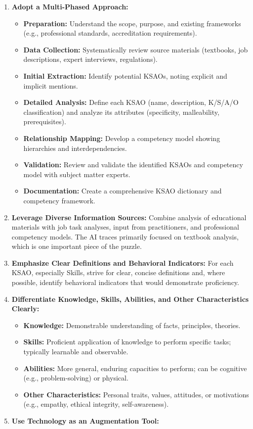 \documentclass[
  letterpaper,
  DIV=11,
  numbers=noendperiod]{scrartcl}
\providecommand{\tightlist}{%
  \setlength{\itemsep}{0pt}\setlength{\parskip}{0pt}}
\begin{document}
\begin{enumerate}
\def\labelenumi{\arabic{enumi}.}
\item
  \textbf{Adopt a Multi-Phased Approach:}

  \begin{itemize}
  \tightlist
  \item
    \textbf{Preparation:} Understand the scope, purpose, and existing
    frameworks (e.g., professional standards, accreditation
    requirements).
  \item
    \textbf{Data Collection:} Systematically review source materials
    (textbooks, job descriptions, expert interviews, regulations).
  \item
    \textbf{Initial Extraction:} Identify potential KSAOs, noting
    explicit and implicit mentions.
  \item
    \textbf{Detailed Analysis:} Define each KSAO (name, description,
    K/S/A/O classification) and analyze its attributes (specificity,
    malleability, prerequisites).
  \item
    \textbf{Relationship Mapping:} Develop a competency model showing
    hierarchies and interdependencies.
  \item
    \textbf{Validation:} Review and validate the identified KSAOs and
    competency model with subject matter experts.
  \item
    \textbf{Documentation:} Create a comprehensive KSAO dictionary and
    competency framework.
  \end{itemize}
\item
  \textbf{Leverage Diverse Information Sources:} Combine analysis of
  educational materials with job task analyses, input from
  practitioners, and professional competency models. The AI traces
  primarily focused on textbook analysis, which is one important piece
  of the puzzle.
\item
  \textbf{Emphasize Clear Definitions and Behavioral Indicators:} For
  each KSAO, especially Skills, strive for clear, concise definitions
  and, where possible, identify behavioral indicators that would
  demonstrate proficiency.
\item
  \textbf{Differentiate Knowledge, Skills, Abilities, and Other
  Characteristics Clearly:}

  \begin{itemize}
  \tightlist
  \item
    \textbf{Knowledge:} Demonstrable understanding of facts, principles,
    theories.
  \item
    \textbf{Skills:} Proficient application of knowledge to perform
    specific tasks; typically learnable and observable.
  \item
    \textbf{Abilities:} More general, enduring capacities to perform;
    can be cognitive (e.g., problem-solving) or physical.
  \item
    \textbf{Other Characteristics:} Personal traits, values, attitudes,
    or motivations (e.g., empathy, ethical integrity, self-awareness).
  \end{itemize}
\item
  \textbf{Use Technology as an Augmentation Tool:}


\end{enumerate}
\end{document}
